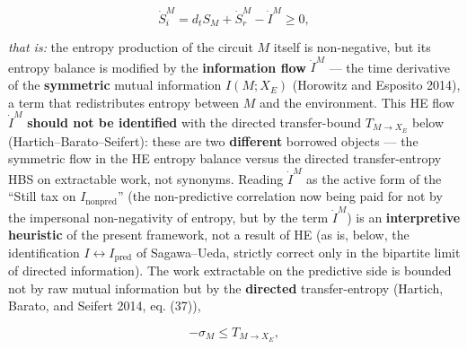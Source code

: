 \documentclass[pdflatex,sn-mathphys-ay]{sn-jnl}
\begin{document}
\[\dot S_i^{M} = d_t S_M + \dot S_r^{M} - \dot I^{M} \ge 0,\]

\emph{that is:} the entropy production of the circuit \(M\) itself is non-negative, but its entropy balance is modified by the \textbf{information flow} \(\dot I^{M}\) --- the time derivative of the \textbf{symmetric} mutual information \(I(M; X_E)\) (Horowitz and Esposito 2014), a term that redistributes entropy between \(M\) and the environment. This HE flow \(\dot I^{M}\) \textbf{should not be identified} with the directed transfer-bound \(T_{M \to X_E}\) below (Hartich--Barato--Seifert): these are two \textbf{different} borrowed objects --- the symmetric flow in the HE entropy balance versus the directed transfer-entropy HBS on extractable work, not synonyms. Reading \(\dot I^{M}\) as the active form of the ``Still tax on \(I_{\text{nonpred}}\)'' (the non-predictive correlation now being paid for not by the impersonal non-negativity of entropy, but by the term \(\dot I^{M}\)) is an \textbf{interpretive heuristic} of the present framework, not a result of HE (as is, below, the identification \(I \leftrightarrow I_{\text{pred}}\) of Sagawa--Ueda, strictly correct only in the bipartite limit of directed information). The work extractable on the predictive side is bounded not by raw mutual information but by the \textbf{directed} transfer-entropy (Hartich, Barato, and Seifert 2014, eq. (37)),

\[-\sigma_{M} \le T_{M \to X_E},\]
\end{document}
